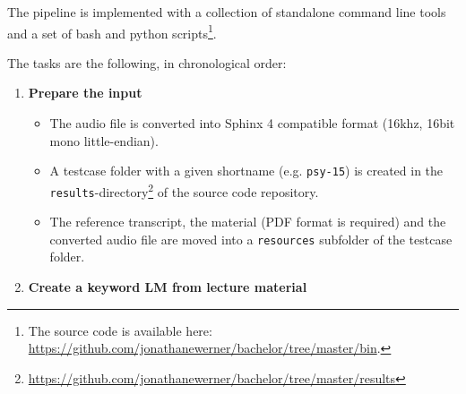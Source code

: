 \documentclass[]{article}
\providecommand{\tightlist}{%
  \setlength{\itemsep}{0pt}\setlength{\parskip}{0pt}}
\begin{document}
The pipeline is implemented with a collection of standalone command line
tools and a set of bash and python scripts\footnote{The source code is
  available here:
  \url{https://github.com/jonathanewerner/bachelor/tree/master/bin}.}.

The tasks are the following, in chronological order:

\begin{enumerate}
\def\labelenumi{\arabic{enumi}.}
\item
  \textbf{Prepare the input}

  \begin{itemize}
  \tightlist
  \item
    The audio file is converted into Sphinx 4 compatible format (16khz,
    16bit mono little-endian).
  \item
    A testcase folder with a given shortname (e.g. \texttt{psy-15}) is
    created in the \texttt{results}-directory\footnote{\url{https://github.com/jonathanewerner/bachelor/tree/master/results}}
    of the source code repository.
  \item
    The reference transcript, the material (PDF format is required) and
    the converted audio file are moved into a \texttt{resources}
    subfolder of the testcase folder.
  \end{itemize}
\item
  \textbf{Create a keyword LM from lecture material}


\end{enumerate}
\end{document}
